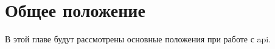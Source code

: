\newpage
\chapter{Общее положение}

В этой главе будут рассмотрены основные положения при работе с api.





